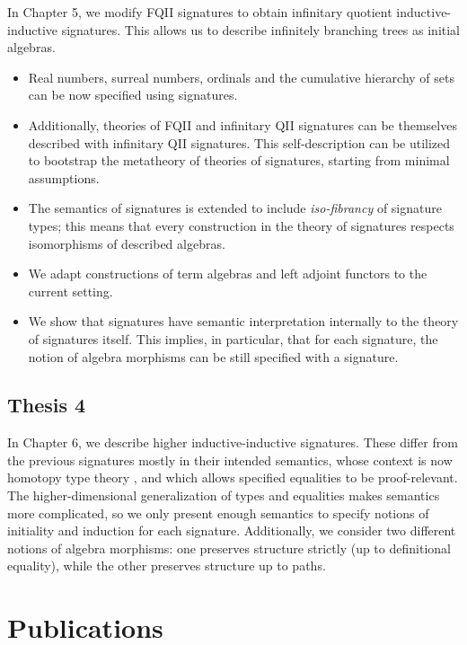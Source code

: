 \documentclass[12pt]{article}
\begin{document}
In Chapter 5, we modify FQII signatures to obtain infinitary quotient
inductive-inductive signatures. This allows us to describe infinitely branching
trees as initial algebras.
\begin{itemize}
\item Real numbers, surreal numbers, ordinals and the cumulative hierarchy of sets
      \cite{hottbook}
      can be now specified using signatures.
\item Additionally, theories of FQII and infinitary QII signatures can be themselves
      described with infinitary QII signatures. This self-description can be utilized
      to bootstrap the metatheory of theories of signatures, starting from minimal
      assumptions.
\item The semantics of signatures is extended to include \emph{iso-fibrancy} of signature
      types; this means that every construction in the theory of signatures respects
      isomorphisms of described algebras.
\item We adapt constructions of term algebras and left adjoint functors to the current setting.
\item We show that signatures have semantic interpretation internally to the
  theory of signatures itself. This implies, in particular, that for each
  signature, the notion of algebra morphisms can be still specified with a
  signature.
\end{itemize}

\subsection*{Thesis 4}
In Chapter 6, we describe higher inductive-inductive signatures. These differ
from the previous signatures mostly in their intended semantics, whose context
is now homotopy type theory \cite{hottbook}, and which allows specified
equalities to be proof-relevant. The higher-dimensional generalization of types
and equalities makes semantics more complicated, so we only present enough
semantics to specify notions of initiality and induction for each
signature. Additionally, we consider two different notions of algebra morphisms:
one preserves structure strictly (up to definitional equality), while the other
preserves structure up to paths.

\section{Publications}
\end{document}
